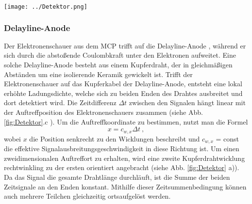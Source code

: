  \begin{center}
 \begin{minipage}{\linewidth}
 \centering
 \texttt{[image: ../Detektor.png]}%
  \label{fig:Detektor}
 \end{minipage} 
 \end{center} 

\subsubsection{Delayline-Anode}

Der Elektronenschauer aus dem MCP trifft auf die Delayline-Anode \cite{sobottka1988}, während er sich durch die abstoßende Coulombkraft unter den Elektronen aufweitet. Eine solche Delayline-Anode besteht aus einem Kupferdraht, der in gleichmäßigen Abständen um eine isolierende Keramik gewickelt ist. Trifft der Elektronenschauer auf das Kupferkabel der Delayline-Anode, entsteht eine lokal erhöhte Ladungsdichte, welche sich zu beiden Enden des Drahtes ausbreitet und dort detektiert wird. Die Zeitdifferenz $\Delta t$ zwischen den Signalen hängt linear mit der Auftreffposition des Elektronenschauers zusammen (siehe Abb. \ref{fig:Detektor}.c ). Um die Auftreffkoordinate zu bestimmen, nutzt man die Formel
\begin{equation}
x = c_{w,x} \Delta t\ ,
\end{equation}
wobei $x$ die Position senkrecht zu den Wicklungen beschreibt und $c_{w,x}$ = const die effektive Signalausbreitungsgeschwindigkeit in diese Richtung ist. Um einen zweidimensionalen Auftreffort zu erhalten, wird eine zweite Kupferdrahtwicklung rechtwinkling zu der ersten orientiert angebracht (siehe Abb. \ref{fig:Detektor} a)). Da das Signal die gesamte Drahtlänge durchläuft, ist die Summe der beiden Zeitsignale an den Enden konstant. Mithilfe dieser Zeitsummenbedingung können auch mehrere Teilchen gleichzeitig ortsaufgelöst werden.

